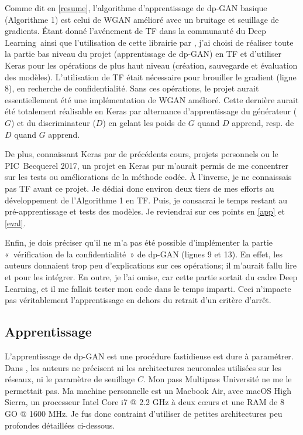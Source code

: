 \documentclass[a4paper,11pt,twoside]{article}
\theoremstyle{definition}
\newcommand{\DL}{Deep Learning}
\begin{document}
Comme dit en \autoref{resume}, l'algorithme d'apprentissage de dp-GAN basique (Algorithme 1) est celui de WGAN amélioré avec un bruitage et seuillage de gradients. Étant donné l'avénement de TF dans la communauté du \DL\ ainsi que l'utilisation de cette librairie par \citet{dpgan}, j'ai choisi de réaliser toute la partie bas niveau du projet (apprentissage de dp-GAN) en TF et d'utiliser Keras pour les opérations de plus haut niveau (création, sauvegarde et évaluation des modèles). L'utilisation de TF était nécessaire pour brouiller le gradient (ligne 8), en recherche de confidentialité. Sans ces opérations, le projet aurait essentiellement été une implémentation de WGAN amélioré. Cette dernière aurait été totalement réalisable en Keras par alternance d'apprentissage du générateur ($G$) et du discriminateur ($D$) en gelant les poids de $G$ quand $D$ apprend, resp. de $D$ quand $G$ apprend.

De plus, connaissant Keras par de précédents cours, projets personnels ou le PIC Becquerel 2017, un projet en Keras pur m'aurait permis de me concentrer sur les tests ou améliorations de la méthode codée. À l'inverse, je ne connaissais pas TF avant ce projet. Je dédiai donc environ deux tiers de mes efforts au développement de l'Algorithme 1 en TF. Puis, je consacrai le temps restant au pré-apprentissage et tests des modèles. Je reviendrai sur ces points en \autoref{app} et \autoref{eval}.

Enfin, je dois préciser qu'il ne m'a pas été possible d'implémenter la partie « vérification de la confidentialité » de dp-GAN (lignes 9 et 13). En effet, les auteurs donnaient trop peu d'explications sur ces opérations; il m'aurait fallu lire \cite{dlwdp} et \cite{pinq} pour les intégrer. En outre, je l'ai omise, car cette partie sortait du cadre \DL, et il me fallait tester mon code dans le temps imparti. Ceci n'impacte pas véritablement l'apprentissage en dehors du retrait d'un critère d'arrêt.


\subsection{Apprentissage}
\label{app}

L'apprentissage de dp-GAN est une procédure fastidieuse est dure à paramétrer. Dans \cite{dpgan}, les auteurs ne précisent ni les architectures neuronales utilisées sur les réseaux, ni le paramètre de seuillage $C$. Mon pass Multipass Université ne me le permettait pas. Ma machine personnelle est un Macbook Air, avec macOS High Sierra, un processeur Intel Core i7 @ 2.2 GHz à deux cœurs et une RAM de 8 GO @ 1600 MHz. Je fus donc contraint d'utiliser de petites architectures peu profondes détaillées ci-dessous.
\end{document}
